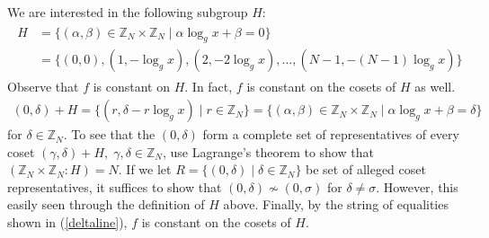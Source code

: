 \documentclass{../quantum.tex}
\begin{document}
We are interested in the following subgroup $H$:
\begin{gather*}
  \begin{split}
    H & = \{ (\alpha,\beta) \in \mathbb{Z}_N \times \mathbb{Z}_N \mid \alpha\log_g{x} + \beta = 0\} \\
      & = \{(0,0), (1, -\log_g{x}), (2, -2 \log_g{x}), \dots ,(N-1, -(N-1)\log_g{x}) \}
  \end{split}
\end{gather*}
Observe that $f$ is constant on $H$. In fact, $f$ is constant on the cosets of $H$ as well.
%
\begin{gather}
  \label{deltaline}
(0, \delta) + H = \{(r, \delta - r \log_g{x}) \mid r \in \mathbb{Z}_N\} = \{ (\alpha,\beta) \in \mathbb{Z}_N \times \mathbb{Z}_N \mid \alpha\log_g{x} + \beta = \delta\}
\end{gather}
for $\delta \in \mathbb{Z}_N$. To see that the $(0,\delta)$ form a complete set of representatives of every coset $(\gamma, \delta) + H, \; \gamma,\delta \in \mathbb{Z}_N$, use Lagrange's theorem to show that $(\mathbb{Z}_N \times \mathbb{Z}_N : H) = N$. If we let $R =\{(0,\delta) \mid \delta \in \mathbb{Z}_N\}$ be set of alleged coset representatives, it suffices to show that $(0,\delta) \not\sim (0,\sigma)$ for $\delta \neq \sigma$. However, this easily seen through the definition of $H$ above. Finally, by the string of equalities shown in (\ref{deltaline}), $f$ is constant on the cosets of $H$.
%
\end{document}
